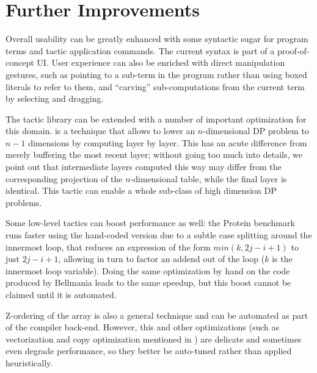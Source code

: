 \medskip\cbstart
\section{Further Improvements}
\label{further}

%
Overall usability can be greatly enhanced with some syntactic sugar
for program terms and tactic application commands.
The current syntax is part of a proof-of-concept UI.
User experience can also be enriched with direct manipulation gestures,
such as pointing to a sub-term in the program rather than using boxed
literals to refer to them, and ``carving'' sub-computations from the
current term by selecting and dragging.

The tactic library can be extended with a number of important optimization
for this domain.  is a technique that
allows to lower an $n$-dimensional DP problem to $n-1$ dimensions by
computing layer by layer.
This has an acute difference from merely buffering the most recent layer;
without going too much into details, we point out that intermediate layers
computed this way may differ from the corresponding projection of the
$n$-dimensional table, while the final layer is identical.
This tactic can enable a whole sub-class of high dimension DP problems.

Some low-level tactics can boost performance as well: the Protein benchmark
runs faster using the hand-coded version due to a subtle case splitting
around the innermost loop, that reduces an expression of the form
$min(k,2j-i+1)$ to just $2j-i+1$, allowing in turn to factor an addend
out of the loop ($k$ is the innermost loop variable).
Doing the same optimization by hand on the code produced by Bellmania leads
to the same speedup, but this boost cannot be claimed until it is automated.

Z-ordering of the array is also a general technique and can be automated
as part of the compiler back-end. However, this and other optimizations (such
as vectorization and copy optimization mentioned in ) are
delicate and sometimes even degrade performance, so they better be auto-tuned
rather than applied heuristically.
\cbend